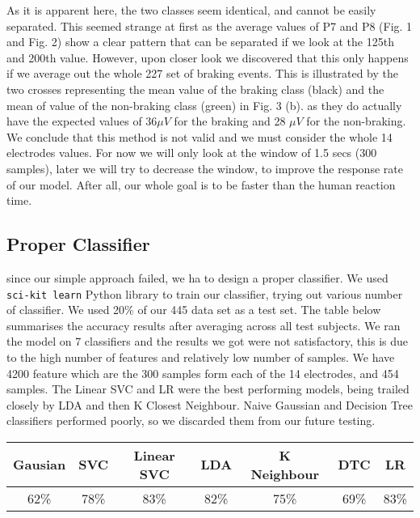 \documentclass{article}
\begin{document}
As it is apparent here, the two classes seem identical, and cannot be easily separated. This seemed strange at first as the average values of P7 and P8 (Fig. 1 and Fig. 2) show a clear pattern that can be separated if we look at the 125th and 200th value. However, upon closer look we discovered that this only happens if we average out the whole 227 set of braking events. 
\newline 
This is illustrated by the two crosses representing the mean value of the braking class (black) and the mean of value of the non-braking class (green) in Fig. 3 (b). as they do actually have the expected values of \(36 \mu V\) for the braking and 28 \(\mu V\) for the non-braking. We conclude that this method is not valid and we must consider the whole 14 electrodes values. For now we will only look at the window of 1.5 secs (300 samples), later we will try to decrease the window, to improve the response rate of our model. After all, our whole goal is to be faster than the human reaction time. 

\subsection{Proper Classifier}

since our simple approach failed, we ha to design a proper classifier. We used \texttt{sci-kit learn} Python library to train our classifier, trying out various number of classifier. We used 20\% of our 445 data set as a test set. 
\newline
The table below summarises the accuracy results after averaging across all test subjects. We ran the model on 7 classifiers and the results we got were not satisfactory, this is due to the high number of features and relatively low number of samples. We have 4200 feature which are the 300 samples form each of the 14 electrodes, and 454 samples. The Linear SVC and LR were the best performing models, being trailed closely by LDA and then K Closest Neighbour. Naive Gaussian and Decision Tree classifiers performed poorly, so we discarded them from our future testing.

\begin{center}
 \begin{tabular}{|c | c | c | c | c | c | c|} 
 \hline
 Gausian & SVC & Linear SVC & LDA & K Neighbour & DTC & LR \\
 \hline
62\% & 78\% & 83\% & 82\% & 75\% & 69\% & 83\% \\ 
 \hline
\end{tabular}
\end{center}
\end{document}

